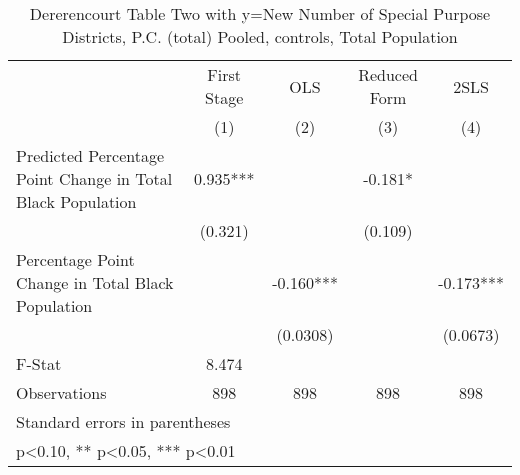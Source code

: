 \begin{table}[htbp]\centering
\def\sym#1{\ifmmode^{#1}\else\(^{#1}\)\fi}
\caption{Dererencourt Table Two with y=New Number of Special Purpose Districts, P.C. (total)  Pooled,  controls, Total Population}
\begin{tabular}{l*{4}{c}}
\toprule
                    & First Stage   &         OLS   &Reduced Form   &        2SLS   \\
                    &\multicolumn{1}{c}{(1)}   &\multicolumn{1}{c}{(2)}   &\multicolumn{1}{c}{(3)}   &\multicolumn{1}{c}{(4)}   \\
\midrule
Predicted Percentage Point Change in Total Black Population&       0.935***&               &      -0.181*  &               \\
                    &     (0.321)   &               &     (0.109)   &               \\
\addlinespace
Percentage Point Change in Total Black Population&               &      -0.160***&               &      -0.173***\\
                    &               &    (0.0308)   &               &    (0.0673)   \\
\midrule
F-Stat              &       8.474   &               &               &               \\
Observations        &         898   &         898   &         898   &         898   \\
\bottomrule
\multicolumn{5}{l}{\footnotesize Standard errors in parentheses}\\
\multicolumn{5}{l}{\footnotesize * p<0.10, ** p<0.05, *** p<0.01}\\
\end{tabular}
\end{table}
